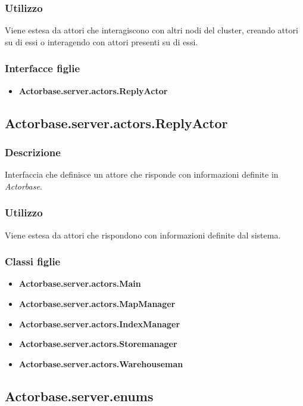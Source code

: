 \documentclass[a4paper]{article}
\begin{document}
			\subsubsection{Utilizzo}
				Viene estesa da attori che interagiscono con altri nodi del cluster, creando attori su di essi o interagendo con attori presenti su di essi. 
				
			\subsubsection{Interfacce figlie}
				\begin{itemize}
					\item \textbf{Actorbase.server.actors.ReplyActor}
				\end{itemize}
				
		\subsection{Actorbase.server.actors.ReplyActor}
			\subsubsection{Descrizione}
				Interfaccia che definisce un attore che risponde con informazioni definite in \emph{Actorbase}.
				
			\subsubsection{Utilizzo}
				Viene estesa da attori che rispondono con informazioni definite dal sistema. 
				
			\subsubsection{Classi figlie}
				\begin{itemize}
					\item \textbf{Actorbase.server.actors.Main}
					\item \textbf{Actorbase.server.actors.MapManager}
					\item \textbf{Actorbase.server.actors.IndexManager}
					\item \textbf{Actorbase.server.actors.Storemanager}
					\item \textbf{Actorbase.server.actors.Warehouseman}
				\end{itemize}
				
		\subsection{Actorbase.server.enums}
		
\end{document}
